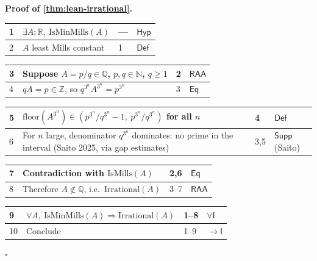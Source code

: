 \documentclass[11pt,reqno]{amsart}
\theoremstyle{blueplain}
\renewcommand{\qedsymbol}{\textcolor{proofqed}{\ensuremath{\square}}}
\renewenvironment{proof}[1][Proof]{\par\noindent\textbf{\textcolor{proofhead}{#1.}}\par\nobreak}{\par\nobreak\hfill\qedsymbol}
\numberwithin{equation}{section}
\begin{document}
\begin{proof}[\textbf{Proof of \cref{thm:lean-irrational}}]
\label{proof:lean-irrational}
{\scriptsize
\begin{tabular}{|m{0.7cm}|m{12cm}|m{1.4cm}|m{2.5cm}|}
\hline
1 & $\exists A:\mathbb{R},\ \mathrm{IsMinMills}(A)$ & --- & $\mathsf{Hyp}$ \\ \hline
2 & $A$ least Mills constant & 1 & $\mathsf{Def}$ \\
\end{tabular}%
\noindent \newline
\noindent
\begin{tabular}{|m{0.7cm}|m{12cm}|m{1.4cm}|m{2.5cm}|}
\hline
3 & Suppose $A=p/q\in\mathbb{Q}$, $p,q\in\mathbb{N}$, $q\ge1$ & 2 & $\mathsf{RAA}$ \\ \hline
4 & $qA=p\in\mathbb{Z}$, so $q^{3^n}A^{3^n}=p^{3^n}$ & 3 & $\mathsf{Eq}$ \\
\end{tabular}%
\noindent \newline
\noindent
\begin{tabular}{|m{0.7cm}|m{12cm}|m{1.4cm}|m{2.5cm}|}
\hline
5 & $\mathrm{floor}(A^{3^n})\in(p^{3^n}/q^{3^n}-1,\ p^{3^n}/q^{3^n})$ for all $n$ & 4 & $\mathsf{Def}$ \\ \hline
6 & For $n$ large, denominator $q^{3^n}$ dominates: no prime in the interval (Saito 2025, via gap estimates) & 3,5 & $\mathsf{Supp}$ (Saito) \\
\end{tabular}%
\noindent \newline
\noindent
\begin{tabular}{|m{0.7cm}|m{12cm}|m{1.4cm}|m{2.5cm}|}
\hline
7 & Contradiction with $\mathrm{IsMills}(A)$ & 2,6 & $\mathsf{Eq}$ \\ \hline
8 & Therefore $A\notin\mathbb{Q}$, i.e.\ $\mathrm{Irrational}(A)$ & 3--7 & $\mathsf{RAA}$ \\
\end{tabular}%
\noindent \newline
\noindent
\begin{tabular}{|m{0.7cm}|m{12cm}|m{1.4cm}|m{2.5cm}|}
\hline
9 & $\forall A,\ \mathrm{IsMinMills}(A)\Rightarrow\mathrm{Irrational}(A)$ & 1--8 & $\forall\mathsf{I}$ \\ \hline
10 & Conclude & 1--9 & $\rightarrow\mathsf{I}$ \\
\end{tabular}%
}
\end{proof}
\end{document}

